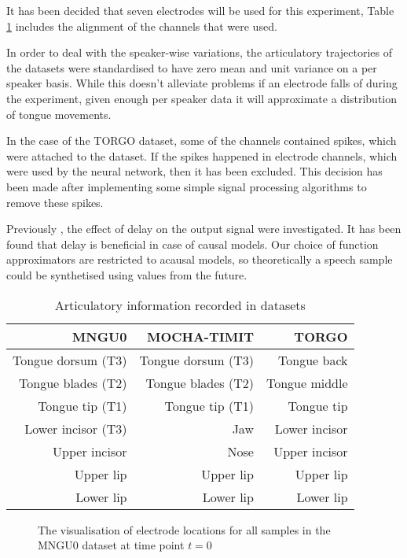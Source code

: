 \documentclass[a4paper]{article}
\begin{document}
It has been decided that seven electrodes will be used for this experiment,
Table \ref{tab:electrodes} includes the alignment of the channels that were used.

In order to deal with the speaker-wise variations, the articulatory trajectories of
the datasets were standardised to have zero mean
and unit variance on a per speaker basis. While this doesn't alleviate problems if an electrode
falls of during the experiment, given enough per speaker data it will approximate a distribution
of tongue movements.

In the case of the TORGO dataset, some of the channels contained spikes, which
were attached to the dataset. If the spikes happened in electrode channels, which were used
by the neural network, then it has been excluded. This decision has been made after implementing
some simple signal processing algorithms to remove these spikes.

Previously \cite{Gonzalez2016}, the effect of delay on the
output signal were investigated. It has been found that delay
is beneficial in case of causal models. Our choice of function approximators are
restricted to acausal models, so theoretically a speech sample could be synthetised using
values from the future. 

\begin{table}[th]
  \label{tab:electrodes}
  \caption{Articulatory information recorded in datasets}
  \centering
  \begin{tabular}{ r r r  }
    \toprule
    \textbf{MNGU0} & \textbf{MOCHA-TIMIT} & \textbf{TORGO} \\ 
    \midrule
    Tongue dorsum (T3) & Tongue dorsum (T3) & Tongue back \\
    Tongue blades (T2) & Tongue blades (T2) & Tongue middle \\
    Tongue tip (T1) & Tongue tip (T1) & Tongue tip \\
    Lower incisor (T3) & Jaw & Lower incisor\\
    Upper incisor & Nose & Upper incisor\\
    Upper lip & Upper lip & Upper lip \\
    Lower lip & Lower lip  & Lower lip\\
    \bottomrule
    \end{tabular}
\end{table}


\begin{figure}[t]
  \begin{center}
    \scalebox{0.50}{}
  \caption{The visualisation of electrode locations for all samples in
    the MNGU0 dataset at time point \( t = 0 \)}
\end{center}
\end{figure}
\end{document}
